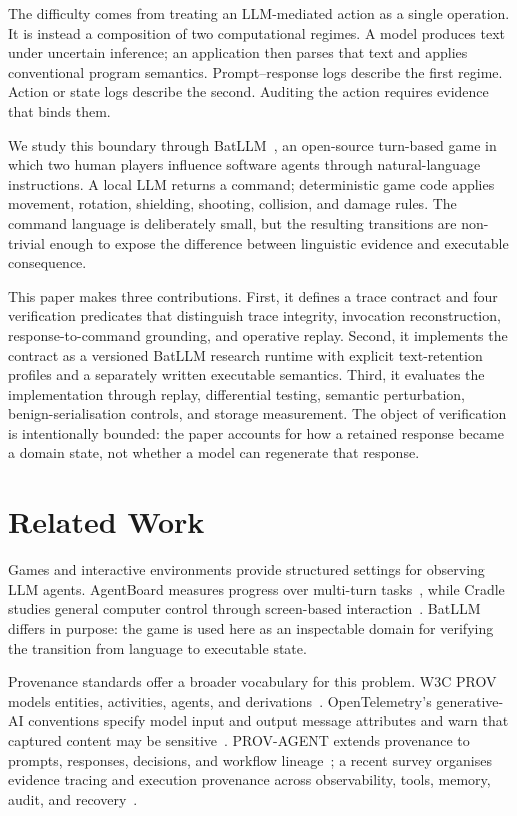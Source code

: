 \documentclass[conference,a4paper]{IEEEtran}
\begin{document}
The difficulty comes from treating an LLM-mediated action as a single operation. It is instead a composition of two computational regimes. A model produces text under uncertain inference; an application then parses that text and applies conventional program semantics. Prompt--response logs describe the first regime. Action or state logs describe the second. Auditing the action requires evidence that binds them.

We study this boundary through BatLLM~\cite{laurenzo2026batllm}, an open-source turn-based game in which two human players influence software agents through natural-language instructions. A local LLM returns a command; deterministic game code applies movement, rotation, shielding, shooting, collision, and damage rules. The command language is deliberately small, but the resulting transitions are non-trivial enough to expose the difference between linguistic evidence and executable consequence.

This paper makes three contributions. First, it defines a trace contract and four verification predicates that distinguish trace integrity, invocation reconstruction, response-to-command grounding, and operative replay. Second, it implements the contract as a versioned BatLLM research runtime with explicit text-retention profiles and a separately written executable semantics. Third, it evaluates the implementation through replay, differential testing, semantic perturbation, benign-serialisation controls, and storage measurement. The object of verification is intentionally bounded: the paper accounts for how a retained response became a domain state, not whether a model can regenerate that response.

\section{Related Work}
Games and interactive environments provide structured settings for observing LLM agents. AgentBoard measures progress over multi-turn tasks~\cite{ma2024agentboard}, while Cradle studies general computer control through screen-based interaction~\cite{tan2025cradle}. BatLLM differs in purpose: the game is used here as an inspectable domain for verifying the transition from language to executable state.

Provenance standards offer a broader vocabulary for this problem. W3C PROV models entities, activities, agents, and derivations~\cite{w3c2013provo}. OpenTelemetry's generative-AI conventions specify model input and output message attributes and warn that captured content may be sensitive~\cite{otel2026genai}. PROV-AGENT extends provenance to prompts, responses, decisions, and workflow lineage~\cite{souza2025provagent}; a recent survey organises evidence tracing and execution provenance across observability, tools, memory, audit, and recovery~\cite{wang2026traces}.
\end{document}
